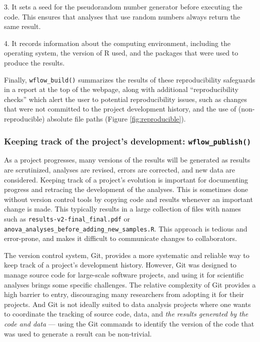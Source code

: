 \documentclass[9pt,a4paper]{extarticle}
\begin{document}
3. It sets a seed for the pseudorandom number generator before executing
the code. This ensures that analyses that use random numbers always
return the same result.

4. It records information about the computing environment, including the
operating system, the version of R used, and the packages that were used
to produce the results.

Finally, \texttt{wflow\_build()} summarizes the results of these reproducibility
safeguards in a report at the top of the webpage, along with additional
“reproducibility checks” which alert the user to potential
reproducibility issues, such as changes that were not committed to the
project development history, and the use of (non-reproducible) absolute
file paths (Figure \ref{fig:reproducible}).

\subsubsection*{Keeping track of the project's development: \texttt{wflow\_publish()}}

As a project progresses, many versions of the results will be generated
as results are scrutinized, analyses are revised, errors are corrected,
and new data are considered. Keeping track of a project's evolution is
important for documenting progress and retracing the development of the
analyses. This is sometimes done without version control tools by
copying code and results whenever an important change is made. This
typically results in a large collection of files with names such as
\texttt{results-v2-final\_final.pdf} or
\texttt{anova\_analyses\_before\_adding\_new\_samples.R}. This approach
is tedious and error-prone, and makes it difficult to communicate
changes to collaborators.

The version control system, Git, provides a more systematic and reliable
way to keep track of a project's development history. However, Git was
designed to manage source code for large-scale software projects, and
using it for scientific analyses brings some specific challenges. The
relative complexity of Git provides a high barrier to entry,
discouraging many researchers from adopting it for their projects. And
Git is not ideally suited to data analysis projects where one wants to
coordinate the tracking of source code, data, and \textit{the results
generated by the code and data} --- using the Git commands to identify
the version of the code that was used to generate a result can be
non-trivial.
\end{document}
